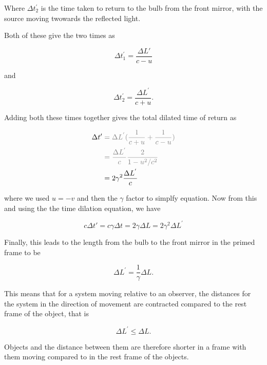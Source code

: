 Where ${\Delta t^{'}_2}$ is the time taken to return to the bulb from the front mirror, with the source moving twowards the reflected light.

Both of these give the two times as

\begin{equation}
	{\Delta t^{'}_1} = \frac{\Delta  L'}{{c} - {u}}
\end{equation}

and

\begin{equation}
	{\Delta t^{'}_2} = \frac{{\Delta  L^{'}}}{{c} + {u}}.
\end{equation}

Adding both these times together gives the total dilated time of return as

\begin{equation}
	\begin{aligned}
	{\Delta t{'}} &\color{gray} = {\Delta  L^{'}}(\frac{1}{{c} + {u}} + \frac{1}{{c} - {u}}) \\
	&\color{gray} = \frac{\Delta  L^{'}}{c}\frac{2}{1- {u}^2/{c}^2} \\
	&=  2{\gamma}^2 \frac{\Delta  L^{'}}{c}
	\end{aligned}
\end{equation}

where we used ${u}=-{v}$ and then the ${\gamma}$ factor to simplfy equation.
Now from this and using the the time dilation equation, we have

\begin{equation}
	{c}{\Delta t{'}} = {c}{\gamma} {\Delta t} = 2{\gamma} {\Delta L} = 2{\gamma}^2 {\Delta  L^{'}}
\end{equation}

Finally, this leads to the length from the bulb to the front mirror in the primed frame to be

\begin{equation}
	{\Delta  L^{'}} = \frac{1}{{\gamma}}{\Delta  L}.
\end{equation}

This means that for a system moving relative to an observer, the distances for the system in the direction of movement are contracted compared to the rest frame of the object, that is

\begin{equation}
	{\Delta  L^{'}} \leq {\Delta  L}.
\end{equation}

Objects and the distance between them are therefore shorter in a frame with them moving compared to in the rest frame of the objects.

